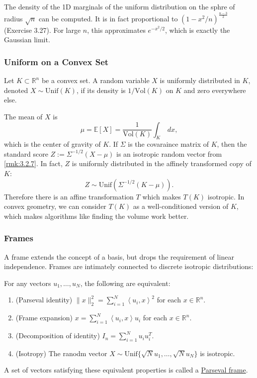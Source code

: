 \begin{remark}
\label{rmk:3.3.11}
The density of the 1D marginals of the uniform distribution on the sphre of radius $\sqrt{n}$ can be 
computed. It is in fact proportional to $(1 - x^2 / n)^{\frac{n-3}{2}}$ (Exercise 3.27). For large $n$, 
this approximates $e^{-x^2 / 2}$, which is exactly the Gaussian limit.
\end{remark}


\subsubsection{Uniform on a Convex Set}
\begin{definition}[]
\label{def:3.3.12}
Let $K \subset \mathbb{R}^n$ be a convex set. A random variable $X$ is uniformly distributed 
in $K$, denoted $X \sim \mathrm{Unif}(K)$, if its density is $1/\mathrm{Vol}(K)$ on $K$ and zero everywhere 
else.
\end{definition}

The mean of $X$ is 
\[ \mu = \mathbb{E}[X] = \frac{1}{\mathrm{Vol}(K)} \int_{K}^{}  \ dx, \]
which is the center of gravity of $K$. If $\Sigma$ is the covaraince matrix of $K$, then the standard score 
$Z := \Sigma^{-1/2}(X - \mu)$ is an isotropic random vector from \cref{rmk:3.2.7}. In fact, $Z$ is uniformly 
distributed in the affinely transformed copy of $K$: 
\[ Z \sim \mathrm{Unif}\left( \Sigma^{-1/2}(K - \mu) \right). \]
Therefore there is an affine transformation $T$ which makes $T(K)$ isotropic. In convex geometry, we can 
consider $T(K)$ as a well-conditioned version of $K$, which makes algorithms like finding the volume work 
better.


\subsubsection{Frames}
A frame extends the concept of a basis, but drops the requirement of linear independence. Frames are intimately 
connected to discrete isotropic distributions: 
\begin{proposition}
\label{prop:3.3.13}
For any vectors $u_1, \dots, u_N$, the following are equivalent: 
\begin{enumerate}[label=(\roman*)]
	\item (Parseval identity) $\lVert x \rVert_{2}^2 = \sum_{i = 1}^{N} \left\langle u_i, x \right\rangle^2$ 
	for each $x \in \mathbb{R}^n$.
	\item (Frame expansion) $x = \sum_{i = 1}^{N} \left\langle u_i, x \right\rangle u_i$ for each $x \in 
	\mathbb{R}^n$.
	\item (Decomposition of identity) $I_n = \sum_{i = 1}^{N} u_i u_i^T$.
	\item (Isotropy) The ranodm vector $X \sim \mathrm{Unif}\{\sqrt{N}u_1, \dots, \sqrt{N}u_N\}$ is isotropic.
\end{enumerate}
A set of vectors satisfying these equivalent properties is called a \underline{Parseval frame}.
\end{proposition}

